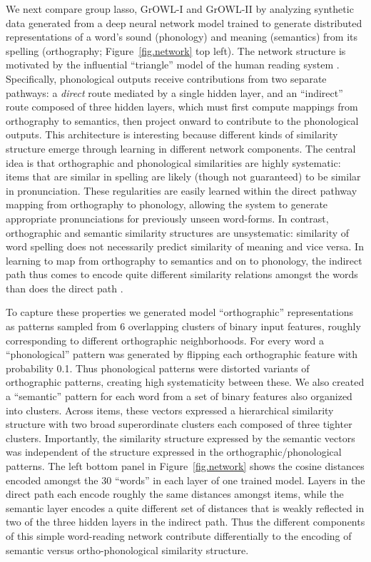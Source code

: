 We next compare group lasso, GrOWL-I and GrOWL-II by analyzing synthetic data generated
from a deep neural network model trained to generate distributed representations of a
word's sound (phonology) and meaning (semantics) from its spelling (orthography;
Figure~\ref{fig.network} top left). The network structure is motivated by the influential
``triangle'' model of the human reading system \citep{PlautETAL96}. Specifically,
phonological outputs receive contributions from two separate pathways: a {\em direct} route
mediated by a single hidden layer, and an ``indirect'' route composed of three hidden
layers, which must first compute mappings from orthography to semantics, then project
onward to contribute to the phonological outputs. This architecture is interesting because
different kinds of similarity structure emerge through learning in different network
components. The central idea is that orthographic and phonological similarities are highly
systematic: items that are similar in spelling are likely (though not guaranteed) to be
similar in pronunciation. These regularities are easily learned within the direct pathway
mapping from orthography to phonology, allowing the system to generate appropriate
pronunciations for previously unseen word-forms. In contrast, orthographic and semantic
similarity structures are unsystematic: similarity of word spelling does not necessarily
predict similarity of meaning and vice versa. In learning to map from orthography to
semantics and on to phonology, the indirect path thus comes to encode quite different
similarity relations amongst the words than does the direct
path \citep{PlautETAL96,HarmSeidenberg04}.

To capture these properties we generated model ``orthographic'' representations as patterns
sampled from 6 overlapping clusters of binary input features, roughly corresponding to
different orthographic neighborhoods. For every word a ``phonological'' pattern was
generated by flipping each orthographic feature with probability 0.1. Thus phonological
patterns were distorted variants of orthographic patterns, creating high systematicity
between these. We also created a ``semantic'' pattern for each word from a set of binary
features also organized into clusters. Across items, these vectors expressed a hierarchical
similarity structure with two broad superordinate clusters each composed of three tighter
clusters. Importantly, the similarity structure expressed by the semantic vectors was
independent of the structure expressed in the orthographic/phonological patterns. The left
bottom panel in Figure~\ref{fig.network} shows the cosine distances encoded amongst the 30
``words'' in each layer of one trained model. Layers in the direct path each encode roughly
the same distances amongst items, while the semantic layer encodes a quite different set of
distances that is weakly reflected in two of the three hidden layers in the indirect path.
Thus the different components of this simple word-reading network contribute differentially
to the encoding of semantic versus ortho-phonological similarity structure.

